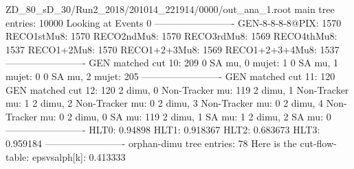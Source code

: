 ZD_80_sD_30/Run2_2018/201014_221914/0000/out_ana_1.root
main tree entries: 10000
Looking at Events 0
-------------------------
GEN-8-8-8-8@PIX: 1570
RECO1stMu8: 1570
RECO2ndMu8: 1570
RECO3rdMu8: 1569
RECO4thMu8: 1537
RECO1+2Mu8: 1570
RECO1+2+3Mu8: 1569
RECO1+2+3+4Mu8: 1537
-------------------------
GEN matched cut 10: 209
0 SA mu, 0 mujet: 1
0 SA mu, 1 mujet: 0
0 SA mu, 2 mujet: 205
-------------------------
GEN matched cut 11: 120
GEN matched cut 12: 120
2 dimu, 0 Non-Tracker mu: 119
2 dimu, 1 Non-Tracker mu: 1
2 dimu, 2 Non-Tracker mu: 0
2 dimu, 3 Non-Tracker mu: 0
2 dimu, 4 Non-Tracker mu: 0
2 dimu, 0 SA mu: 119
2 dimu, 1 SA mu: 1
2 dimu, 2 SA mu: 0
-------------------------
HLT0: 0.94898
HLT1: 0.918367
HLT2: 0.683673
HLT3: 0.959184
-------------------------
orphan-dimu tree entries: 78
Here is the cut-flow-table:
epsvsalph[k]: 0.413333
        
